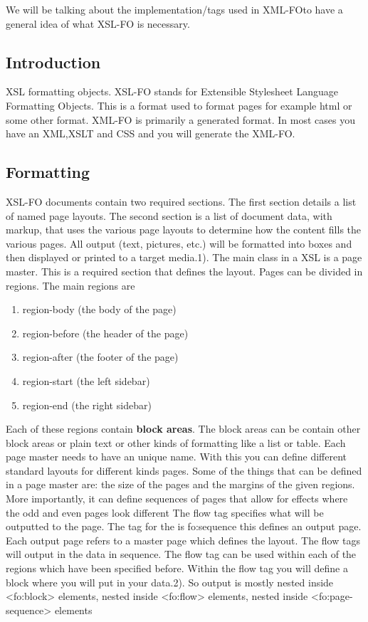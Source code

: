 We will be talking about the implementation/tags used in XML-FOto have a general idea of what XSL-FO is necessary.

\subsection{Introduction}


XSL formatting objects. XSL-FO stands for Extensible Stylesheet Language Formatting Objects. This is a format used to format pages for example html or some other format. XML-FO is primarily a generated format. In most cases you have an XML,XSLT and CSS and you will generate the XML-FO.
\subsection{Formatting}

XSL-FO documents contain two required sections. The first section details a list of named page layouts. The second section is a list of document data, with markup, that uses the various page layouts to determine how the content fills the various pages. All output (text, pictures, etc.) will be formatted into boxes and then displayed or printed to a target media.1). The main class in a XSL is a page master. This is a required section that defines the layout. Pages can be divided in regions. The main regions are

\begin{enumerate}
	\item region-body (the body of the page)
    \item region-before (the header of the page)
    \item region-after (the footer of the page)
    \item region-start (the left sidebar)
    \item region-end (the right sidebar)
\end{enumerate}


Each of these regions contain \textbf{block areas}. The block areas can be contain other block areas or plain text or other kinds of formatting like a list or table. Each page master needs to have an unique name. With this you can define different standard layouts for different kinds pages. Some of the things that can be defined in a page master are: the size of the pages and the margins of the given regions. More importantly, it can define sequences of pages that allow for effects where the odd and even pages look different The flow tag specifies what will be outputted to the page. The tag for the is fo:sequence this defines an output page. Each output page refers to a master page which defines the layout. The flow tags will output in the data in sequence. The flow tag can be used within each of the regions which have been specified before. Within the flow tag you will define a block where you will put in your data.2). So output is mostly nested inside <fo:block> elements, nested inside <fo:flow> elements, nested inside <fo:page-sequence> elements

